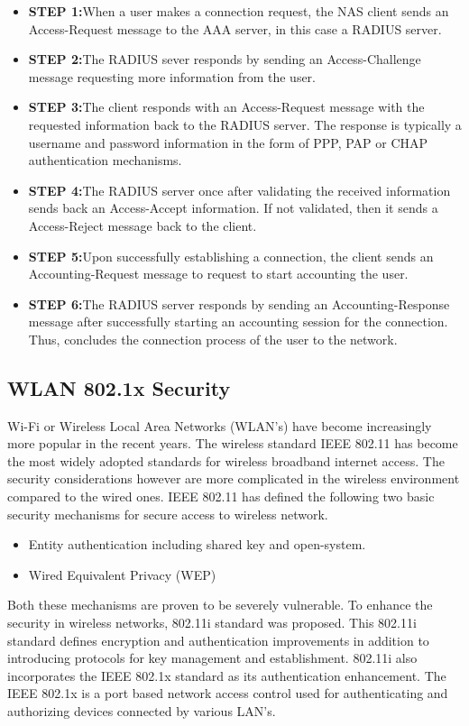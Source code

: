 \begin{itemize}
	\item \textbf{STEP 1:}When a user makes a connection request, the NAS client sends an Access-Request message to the AAA server, in this case a RADIUS server.
	\item \textbf{STEP 2:}The RADIUS sever responds by sending an Access-Challenge message requesting more information from the user.
	\item \textbf{STEP 3:}The client responds with an Access-Request message with the requested information back to the RADIUS server. The response is typically a username and password information in the form of PPP, PAP or CHAP authentication mechanisms.
	\item \textbf{STEP 4:}The RADIUS server once after validating the received information sends back an Access-Accept information. If not validated, then it sends a Access-Reject message back to the client.
	\item \textbf{STEP 5:}Upon successfully establishing a connection, the client sends an Accounting-Request message to request to start accounting the user.
	\item \textbf{STEP 6:}The RADIUS server responds by sending an Accounting-Response message after successfully starting an accounting session for the connection. Thus, concludes the connection process of the user to the network.
	
\end{itemize}

\subsection{WLAN 802.1x Security \cite{WLAN_802.1x}} \label{802.1x}
Wi-Fi or Wireless Local Area Networks (WLAN’s) have become increasingly more popular in the recent years. The wireless standard IEEE 802.11 has become the most widely adopted standards for wireless broadband internet access. The security considerations however are more complicated in the wireless environment compared to the wired ones. IEEE 802.11 has defined the following two basic security mechanisms for secure access to wireless network.
\begin{itemize}
	\item Entity authentication including shared key and open-system.
	\item Wired Equivalent Privacy (WEP)
\end{itemize}
Both these mechanisms are proven to be severely vulnerable. To enhance the security in wireless networks, 802.11i standard was proposed. This 802.11i standard defines encryption and authentication improvements in addition to introducing protocols for key management and establishment. 802.11i also incorporates the IEEE 802.1x standard as its authentication enhancement. The IEEE 802.1x is a port based network access control used for authenticating and authorizing devices connected by various LAN’s.

